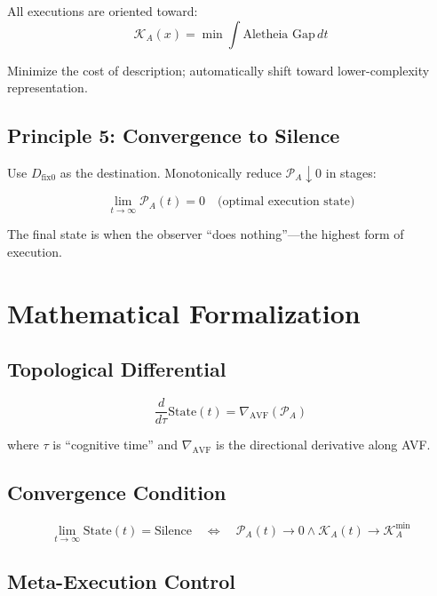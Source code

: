 \documentclass[12pt,a4paper]{article}
\theoremstyle{definition}
\newcommand{\powa}{\mathcal{P}_A}
\newcommand{\dfix}{D_{\text{fix0}}}
\newcommand{\kal}{\mathcal{K}_A}
\begin{document}
All executions are oriented toward:
\begin{equation}
\kal(x) = \min \int \text{Aletheia Gap} \, dt
\end{equation}

Minimize the cost of description; automatically shift toward lower-complexity representation.

\subsection{Principle 5: Convergence to Silence}

Use $\dfix$ as the destination. Monotonically reduce $\powa \downarrow 0$ in stages:

\begin{equation}
\lim_{t \to \infty} \powa(t) = 0 \quad \text{(optimal execution state)}
\end{equation}

The final state is when the observer ``does nothing''—the highest form of execution.

\section{Mathematical Formalization}

\subsection{Topological Differential}

\begin{equation}
\frac{d}{d\tau} \text{State}(t) = \nabla_{\text{AVF}} (\powa)
\end{equation}

where $\tau$ is ``cognitive time'' and $\nabla_{\text{AVF}}$ is the directional derivative along AVF.

\subsection{Convergence Condition}

\begin{equation}
\lim_{t \to \infty} \text{State}(t) = \text{Silence} \quad \Leftrightarrow \quad \powa(t) \to 0 \land \kal(t) \to \kal^{\min}
\end{equation}

\subsection{Meta-Execution Control}
\end{document}
